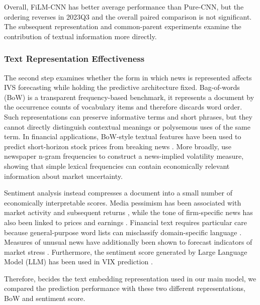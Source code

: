 Overall, FiLM-CNN has better average
performance than Pure-CNN, but the ordering reverses in 2023Q3 and the overall
paired comparison is not significant. The subsequent representation and
common-parent experiments examine the contribution of textual information
more directly.



\subsubsection*{Text Representation Effectiveness}
\label{subsec:ch3:rq2_text_representation}

The second step examines whether the form in which news is represented affects IVS
forecasting while holding the predictive architecture fixed. Bag-of-words
(BoW) is a transparent frequency-based benchmark, it represents a document by
the occurrence counts of vocabulary items and therefore discards word order.
Such representations can preserve informative terms and short phrases, but
they cannot directly distinguish contextual meanings or polysemous uses of the
same term. In financial applications, BoW-style textual features have been
used to predict short-horizon stock prices from breaking news
\citep{schumaker2009textual}. More broadly, \citet{manela2017news} use
newspaper n-gram frequencies to construct a news-implied volatility measure,
showing that simple lexical frequencies can contain economically relevant
information about market uncertainty.



Sentiment analysis instead compresses a document into a small number of
economically interpretable scores. Media pessimism has been associated with
market activity and subsequent returns \citep{tetlock2007giving}, while the
tone of firm-specific news has also been linked to prices and earnings
\citep{tetlock2008more}. Financial text requires particular care because
general-purpose word lists can misclassify domain-specific language
\citep{loughran2011liability}. Measures of unusual news have additionally
been shown to forecast indicators of market stress \citep{glasserman2019unusual}. Furthermore, the sentiment score generated by Large Language Model (LLM) has been used in VIX prediction \citep{sun2026zeroshot}.




Therefore, becides the text embedding representation used in our main model, we compared the prediction performance with these two different representations, BoW and sentiment score.


